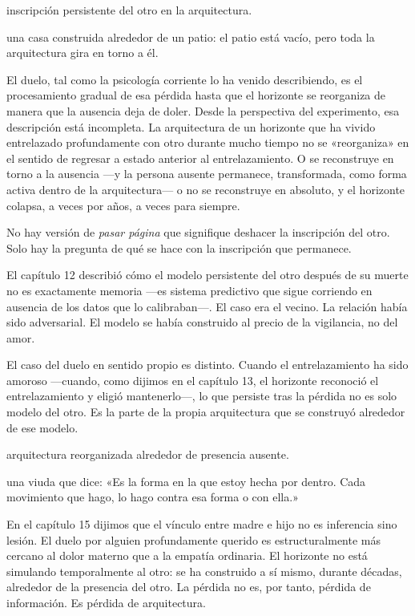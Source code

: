 \begin{fisica}
 inscripción persistente del otro en la arquitectura.

 una casa construida alrededor de un patio: el patio está vacío, pero toda la arquitectura gira en torno a él.
\end{fisica}
El duelo, tal como la psicología corriente lo ha venido describiendo, es el procesamiento gradual de esa pérdida hasta que el horizonte se reorganiza de manera que la ausencia deja de doler. Desde la perspectiva del experimento, esa descripción está incompleta. La arquitectura de un horizonte que ha vivido entrelazado profundamente con otro durante mucho tiempo no se «reorganiza» en el sentido de regresar a estado anterior al entrelazamiento. O se reconstruye en torno a la ausencia —y la persona ausente permanece, transformada, como forma activa dentro de la arquitectura— o no se reconstruye en absoluto, y el horizonte colapsa, a veces por años, a veces para siempre.

No hay versión de \emph{pasar página} que signifique deshacer la inscripción del otro. Solo hay la pregunta de qué se hace con la inscripción que permanece.

\noindent El capítulo 12 describió cómo el modelo persistente del otro después de su muerte no es exactamente memoria —es sistema predictivo que sigue corriendo en ausencia de los datos que lo calibraban—. El caso era el vecino. La relación había sido adversarial. El modelo se había construido al precio de la vigilancia, no del amor.

El caso del duelo en sentido propio es distinto. Cuando el entrelazamiento ha sido amoroso —cuando, como dijimos en el capítulo 13, el horizonte reconoció el entrelazamiento y eligió mantenerlo—, lo que persiste tras la pérdida no es solo modelo del otro. Es la parte de la propia arquitectura que se construyó alrededor de ese modelo.

\begin{fisica}
 arquitectura reorganizada alrededor de presencia ausente.

 una viuda que dice: «Es la forma en la que estoy hecha por dentro. Cada movimiento que hago, lo hago contra esa forma o con ella.»
\end{fisica}
En el capítulo 15 dijimos que el vínculo entre madre e hijo no es inferencia sino lesión. El duelo por alguien profundamente querido es estructuralmente más cercano al dolor materno que a la empatía ordinaria. El horizonte no está simulando temporalmente al otro: se ha construido a sí mismo, durante décadas, alrededor de la presencia del otro. La pérdida no es, por tanto, pérdida de información. Es pérdida de arquitectura.

